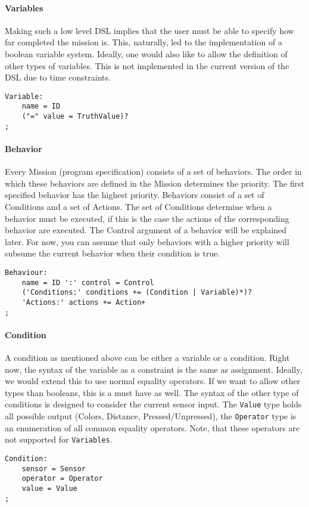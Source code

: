 \documentclass{scrartcl}
\begin{document}
\paragraph{Variables}
Making such a low level DSL implies that the user must be able to specify how far completed the mission is.
This, naturally, led to the implementation of a boolean variable system.
Ideally, one would also like to allow the definition of other types of variables.
This is not implemented in the current version of the DSL due to time constraints.
\begin{verbatim}
Variable:
	name = ID
	("=" value = TruthValue)?
;
\end{verbatim}

\paragraph{Behavior}
Every Mission (program specification) consists of a set of behaviors.
The order in which these behaviors are defined in the Mission determines the priority.
The first specified behavior has the highest priority.
Behaviors consist of a set of Conditions and a set of Actions.
The set of Conditions determine when a behavior must be executed, if this is the case the actions of the corresponding behavior are executed.
The Control argument of a behavior will be explained later.
For now, you can assume that only behaviors with a higher priority will subsume the current behavior when their condition is true.
\begin{verbatim}
Behaviour:
	name = ID ':' control = Control
	('Conditions:' conditions += (Condition | Variable)*)?
	'Actions:' actions += Action+
;
\end{verbatim}

\paragraph{Condition}
A condition as mentioned above can be either a variable or a condition.
Right now, the syntax of the variable as a constraint is the same as assignment.
Ideally, we would extend this to use normal equality operators.
If we want to allow other types than booleans, this is a must have as well.
The syntax of the other type of conditions is designed to consider the current sensor input.
The \texttt{Value} type holds all possible output (Colors, Distance, Pressed/Unpressed), the \texttt{Operator} type is an enumeration of all common equality operators.
Note, that these operators are not supported for \texttt{Variables}.
\begin{verbatim}
Condition:
	sensor = Sensor
	operator = Operator
	value = Value
;
\end{verbatim}
\end{document}
